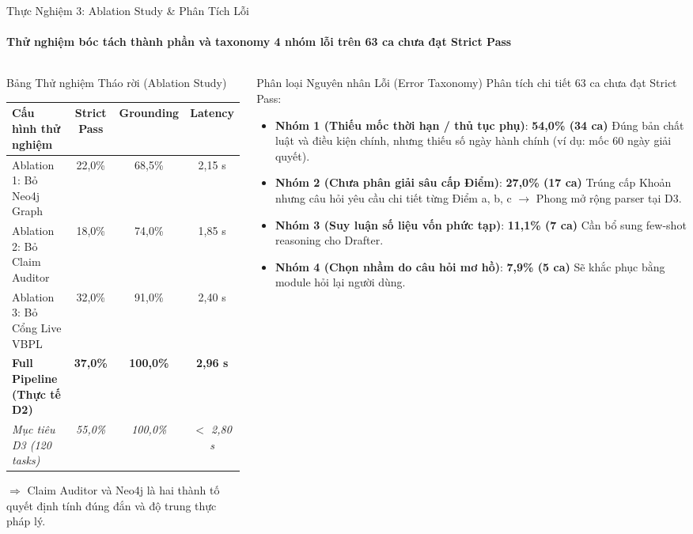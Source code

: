 \documentclass[aspectratio=169,10pt,xcolor={table}]{beamer}
\begin{document}
\begin{frame}{Thực Nghiệm 3: Ablation Study \& Phân Tích Lỗi}
\framesubtitle{Thử nghiệm bóc tách thành phần và taxonomy 4 nhóm lỗi trên 63 ca chưa đạt Strict Pass}
\begin{columns}[T]
\begin{column}{0.48\textwidth}
\begin{block}{\small Bảng Thử nghiệm Tháo rời (Ablation Study)}
\centering\scriptsize
\begin{tabularx}{\linewidth}{@{}Xccc@{}}
\toprule
\textbf{Cấu hình thử nghiệm} & \textbf{Strict Pass} & \textbf{Grounding} & \textbf{Latency} \\ \midrule
Ablation 1: Bỏ Neo4j Graph & 22,0\% & 68,5\% & 2,15 s \\
Ablation 2: Bỏ Claim Auditor & 18,0\% & 74,0\% & 1,85 s \\
Ablation 3: Bỏ Cổng Live VBPL & 32,0\% & 91,0\% & 2,40 s \\
\textbf{Full Pipeline (Thực tế D2)} & \textbf{37,0\%} & \textbf{100,0\%} & \textbf{2,96 s} \\
\emph{Mục tiêu D3 (120 tasks)} & \emph{55,0\%} & \emph{100,0\%} & \emph{$<$ 2,80 s} \\
\bottomrule
\end{tabularx}
\vskip0.05cm
{\tiny $\Rightarrow$ Claim Auditor và Neo4j là hai thành tố quyết định tính đúng đắn và độ trung thực pháp lý.}
\end{block}
\end{column}

\begin{column}{0.50\textwidth}
\begin{block}{\small Phân loại Nguyên nhân Lỗi (Error Taxonomy)}
\footnotesize
Phân tích chi tiết 63 ca chưa đạt Strict Pass:
\begin{itemize}\scriptsize
  \item \textbf{Nhóm 1 (Thiếu mốc thời hạn / thủ tục phụ)}: \textbf{54,0\% (34 ca)}
    \newline Đúng bản chất luật và điều kiện chính, nhưng thiếu số ngày hành chính (ví dụ: mốc 60 ngày giải quyết).
  \item \textbf{Nhóm 2 (Chưa phân giải sâu cấp Điểm)}: \textbf{27,0\% (17 ca)}
    \newline Trúng cấp Khoản nhưng câu hỏi yêu cầu chi tiết từng Điểm a, b, c $\to$ Phong mở rộng parser tại D3.
  \item \textbf{Nhóm 3 (Suy luận số liệu vốn phức tạp)}: \textbf{11,1\% (7 ca)}
    \newline Cần bổ sung few-shot reasoning cho Drafter.
  \item \textbf{Nhóm 4 (Chọn nhầm do câu hỏi mơ hồ)}: \textbf{7,9\% (5 ca)}
    \newline Sẽ khắc phục bằng module hỏi lại người dùng.
\end{itemize}
\end{block}
\end{column}
\end{columns}
\end{frame}
\end{document}
